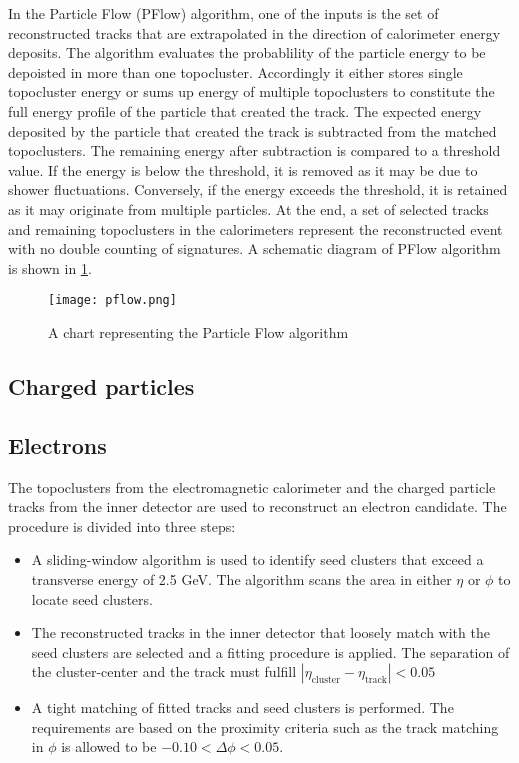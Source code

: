 In the Particle Flow (PFlow) algorithm, one of the inputs is the set of reconstructed tracks that are extrapolated
in the direction of calorimeter energy deposits. The algorithm evaluates the probablility of the particle
energy to be depoisted in more than one topocluster. Accordingly it either stores single topocluster energy
or sums up energy of multiple topoclusters to constitute the full energy profile of the particle that created the
track. The expected energy deposited by the particle that created the track is subtracted from the matched
topoclusters. The remaining energy after subtraction is compared to a threshold value. If the energy is below the 
threshold, it is removed as it may be due to shower fluctuations. Conversely, if the energy exceeds the threshold, 
it is retained as it may originate from multiple particles. At the end, a set of selected tracks and remaining
topoclusters in the calorimeters represent the reconstructed event with no double counting of signatures. A schematic 
diagram of PFlow algorithm is shown in \cref{fig:pflow}.

\begin{figure}[htbp]
    \centering
    \texttt{[image: pflow.png]}
    \caption[Particle flow overview]{A chart representing the Particle Flow algorithm~\cite{Aaboud:2257597}}%
    \label{fig:pflow}
\end{figure}

\subsection{Charged particles}
\subsection*{Electrons}
The topoclusters from the electromagnetic calorimeter and the charged particle tracks from the inner
detector are used to reconstruct an electron candidate. The procedure is divided into three steps:
\begin{itemize}
    \item A sliding-window algorithm is used to identify seed clusters that exceed a transverse
    energy of 2.5 GeV. The algorithm scans the area in either $\eta$ or $\phi$ to locate seed clusters. 
    \item The reconstructed tracks in the inner detector that loosely match with the seed clusters
    are selected and a fitting procedure is applied. The separation of the cluster-center and the 
    track must fulfill $|\eta_{\text{cluster}} - \eta_{\text{track}}|<0.05$
    \item A tight matching of fitted tracks and seed clusters is performed. The requirements are based
    on the proximity criteria such as the track matching in $\phi$ is allowed to be $-0.10< \Delta\phi <0.05$.
\end{itemize}

